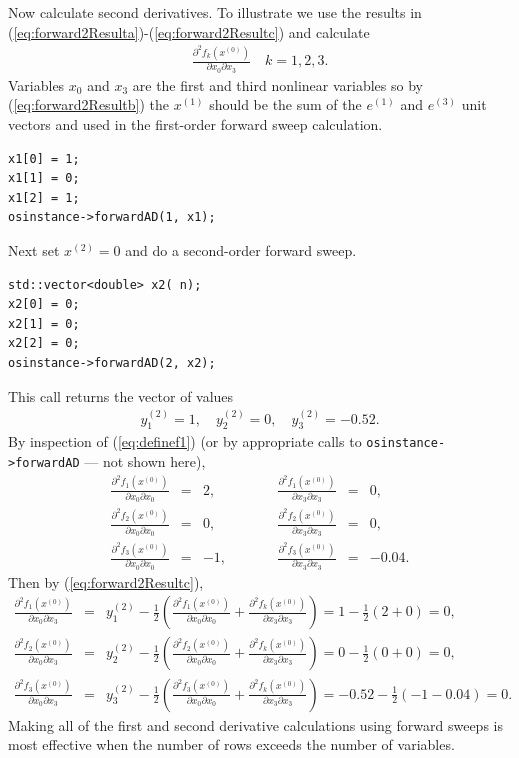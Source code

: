 \documentclass[11pt]{article}
\newcommand{\DD}[3]{ \frac{\partial^2 #1}{\partial #2 \partial #3} }
\renewcommand{\_}{{\char"5F}}
\renewcommand{\{}{{\char"7B}}
\renewcommand{\}}{{\char"7D}}
\renewcommand{\^}{{\char"0D}}
\renewcommand{\'}{{\char"0D}}
\begin{document}
\begin{enumerate}[Step 1:]
Now calculate second derivatives.  To illustrate we use the results in (\ref{eq:forward2Resulta})-(\ref{eq:forward2Resultc}) and calculate
\begin{eqnarray*}
\DD{f_{k}(x^{(0)})}{x_{0}}{x_{3}} \quad k = 1, 2, 3.
\end{eqnarray*}
Variables $x_{0}$ and $x_{3}$ are the first and third nonlinear variables so by  (\ref{eq:forward2Resultb}) the $x^{(1)}$ should be the sum of the $e^{(1)}$ and $e^{(3)}$ unit vectors and used in the  first-order forward sweep calculation.
\begin{verbatim}
x1[0] = 1;
x1[1] = 0;
x1[2] = 1;
osinstance->forwardAD(1, x1);
\end{verbatim}
Next set $x^{(2)} = 0$ and do a second-order forward sweep.
\begin{verbatim}
std::vector<double> x2( n);
x2[0] = 0;
x2[1] = 0;
x2[2] = 0;
osinstance->forwardAD(2, x2);
\end{verbatim}
This call returns the vector of  values
\begin{eqnarray*}
y_{1}^{(2)}  = 1, \quad y_{2}^{(2)}  = 0, \quad y_{3}^{(2)} = -0.52.
\end{eqnarray*}
By inspection of (\ref{eq:definef1}) (or by appropriate calls to {\tt osinstance->forwardAD} --- not shown here),
$$
\begin{array}{rclcrcl}
\displaystyle{\DD{f_{1}(x^{(0)})}{x_{0}}{x_{0}}} &=&  2, & \qquad & 
\displaystyle{\DD{f_{1}(x^{(0)})}{x_{3}}{x_{3}}} &=&  0, \\ [12pt]
\displaystyle{\DD{f_{2}(x^{(0)})}{x_{0}}{x_{0}}} &=&  0, & \qquad & 
\displaystyle{\DD{f_{2}(x^{(0)})}{x_{3}}{x_{3}}} &=&  0, \\ [12pt]
\displaystyle{\DD{f_{3}(x^{(0)})}{x_{0}}{x_{0}}} &=& -1, & \qquad & 
\displaystyle{\DD{f_{3}(x^{(0)})}{x_{3}}{x_{3}}} &=& -0.04.
\end{array}
$$
Then by (\ref{eq:forward2Resultc}),
\begin{eqnarray*}
\DD{f_{1}(x^{(0)})}{x_{0}}{x_{3}} &=&  y_{1}^{(2)}  -  \frac{1}{2} \left( \DD{f_{1}(x^{(0)})}{x_{0}}{x_{0}}  +  \DD{f_{k}(x^{(0)})}{x_{3}}{x_{3}}  \right) = 1   -    \frac{1}{2}(2 +  0) = 0, \\
\DD{f_{2}(x^{(0)})}{x_{0}}{x_{3}} &=&  y_{2}^{(2)}  -  \frac{1}{2} \left( \DD{f_{2}(x^{(0)})}{x_{0}}{x_{0}}  +  \DD{f_{k}(x^{(0)})}{x_{3}}{x_{3}}  \right) = 0   -    \frac{1}{2}(0 +  0) = 0, \\
\DD{f_{3}(x^{(0)})}{x_{0}}{x_{3}} &=&  y_{3}^{(2)}  -  \frac{1}{2} \left( \DD{f_{3}(x^{(0)})}{x_{0}}{x_{0}}  +  \DD{f_{k}(x^{(0)})}{x_{3}}{x_{3}}  \right) = -0.52 -  \frac{1}{2}(-1 - 0.04) = 0.
\end{eqnarray*}
Making all of the first and second derivative calculations using forward sweeps is most effective when the number of rows exceeds the number of variables.



\end{enumerate}
\end{document}
